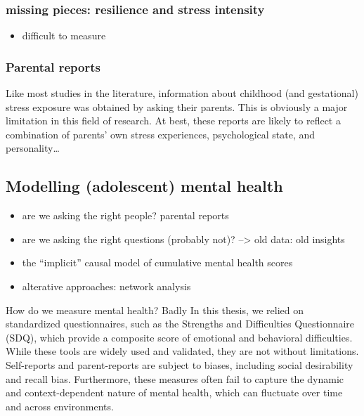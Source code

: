 \documentclass[
  letterpaper,
  DIV=11,
  numbers=noendperiod]{scrreport}
\providecommand{\tightlist}{%
  \setlength{\itemsep}{0pt}\setlength{\parskip}{0pt}}
\begin{document}
\subsubsection{missing pieces: resilience and stress
intensity}\label{missing-pieces-resilience-and-stress-intensity}

\begin{itemize}
\tightlist
\item
  difficult to measure
\end{itemize}

\subsubsection{Parental reports}\label{parental-reports}

Like most studies in the literature, information about childhood (and
gestational) stress exposure was obtained by asking their parents. This
is obviously a major limitation in this field of research. At best,
these reports are likely to reflect a combination of parents' own stress
experiences, psychological state, and personality\ldots{}

\subsection{Modelling (adolescent) mental
health}\label{modelling-adolescent-mental-health}

\begin{itemize}
\tightlist
\item
  are we asking the right people? parental reports
\item
  are we asking the right questions (probably not)? --\textgreater{} old
  data: old insights
\item
  the ``implicit'' causal model of cumulative mental health scores
\item
  alterative approaches: network analysis
\end{itemize}

How do we measure mental health? Badly In this thesis, we relied on
standardized questionnaires, such as the Strengths and Difficulties
Questionnaire (SDQ), which provide a composite score of emotional and
behavioral difficulties. While these tools are widely used and
validated, they are not without limitations. Self-reports and
parent-reports are subject to biases, including social desirability and
recall bias. Furthermore, these measures often fail to capture the
dynamic and context-dependent nature of mental health, which can
fluctuate over time and across environments.
\end{document}
